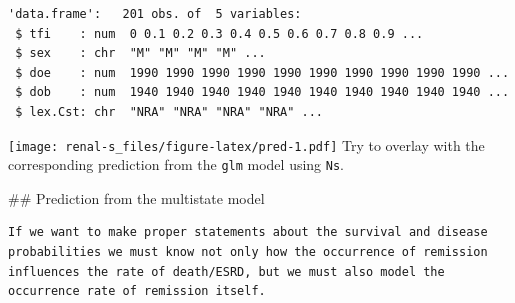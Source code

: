\documentclass[
]{book}
\newenvironment{Shaded}{\begin{snugshade}}{\end{snugshade}}
\newcommand{\AttributeTok}[1]{\textcolor[rgb]{0.13,0.29,0.53}{#1}}
\newcommand{\ConstantTok}[1]{\textcolor[rgb]{0.56,0.35,0.01}{#1}}
\newcommand{\DecValTok}[1]{\textcolor[rgb]{0.00,0.00,0.81}{#1}}
\newcommand{\FunctionTok}[1]{\textcolor[rgb]{0.13,0.29,0.53}{\textbf{#1}}}
\newcommand{\NormalTok}[1]{#1}
\newcommand{\SpecialCharTok}[1]{\textcolor[rgb]{0.81,0.36,0.00}{\textbf{#1}}}
\newcommand{\StringTok}[1]{\textcolor[rgb]{0.31,0.60,0.02}{#1}}
\begin{document}
\begin{enumerate}
\begin{verbatim}
'data.frame':   201 obs. of  5 variables:
 $ tfi    : num  0 0.1 0.2 0.3 0.4 0.5 0.6 0.7 0.8 0.9 ...
 $ sex    : chr  "M" "M" "M" "M" ...
 $ doe    : num  1990 1990 1990 1990 1990 1990 1990 1990 1990 1990 ...
 $ dob    : num  1940 1940 1940 1940 1940 1940 1940 1940 1940 1940 ...
 $ lex.Cst: chr  "NRA" "NRA" "NRA" "NRA" ...
\end{verbatim}

\begin{Shaded}
\end{Shaded}

  \texttt{[image: renal-s\_files/figure-latex/pred-1.pdf]}
  Try to overlay with the corresponding prediction from the
  \texttt{glm} model using \texttt{Ns}.
\end{enumerate}

\#\# Prediction from the multistate model

\begin{verbatim}
If we want to make proper statements about the survival and disease
probabilities we must know not only how the occurrence of remission
influences the rate of death/ESRD, but we must also model the
occurrence rate of remission itself.
\end{verbatim}
\end{document}
